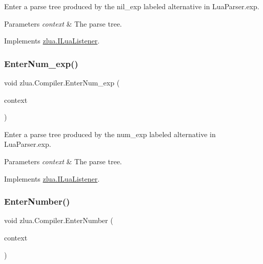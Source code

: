 Enter a parse tree produced by the {\ttfamily nil\+\_\+exp} labeled alternative in Lua\+Parser.\+exp. 


\begin{DoxyParams}{Parameters}
{\em context} & The parse tree.\\
\hline
\end{DoxyParams}


Implements \mbox{\hyperlink{interfacezlua_1_1_i_lua_listener_aafcaca4386184948c08ead3b5dbba3be}{zlua.\+I\+Lua\+Listener}}.

\mbox{\label{classzlua_1_1_compiler_a8ef740c20e6771534630c1c897f0f2f4}} 
\subsubsection{\texorpdfstring{Enter\+Num\+\_\+exp()}{EnterNum\_exp()}}
{\footnotesize\ttfamily void zlua.\+Compiler.\+Enter\+Num\+\_\+exp (\begin{DoxyParamCaption}\item[{\mbox{[}\+Not\+Null\mbox{]} \mbox{\hyperlink{classzlua_1_1_lua_parser_1_1_num__exp_context}{Lua\+Parser.\+Num\+\_\+exp\+Context}}}]{context }\end{DoxyParamCaption})}



Enter a parse tree produced by the {\ttfamily num\+\_\+exp} labeled alternative in Lua\+Parser.\+exp. 


\begin{DoxyParams}{Parameters}
{\em context} & The parse tree.\\
\hline
\end{DoxyParams}


Implements \mbox{\hyperlink{interfacezlua_1_1_i_lua_listener_aaa1853b8a53c94c2e6a7ee14bc38a698}{zlua.\+I\+Lua\+Listener}}.

\mbox{\label{classzlua_1_1_compiler_a1bbda8fe66a0e085fa7b659d1690cda8}} 
\subsubsection{\texorpdfstring{Enter\+Number()}{EnterNumber()}}
{\footnotesize\ttfamily void zlua.\+Compiler.\+Enter\+Number (\begin{DoxyParamCaption}\item[{\mbox{[}\+Not\+Null\mbox{]} \mbox{\hyperlink{classzlua_1_1_lua_parser_1_1_number_context}{Lua\+Parser.\+Number\+Context}}}]{context }\end{DoxyParamCaption})}



